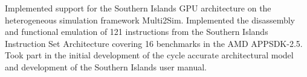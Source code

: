   { Implemented support for the Southern Islands GPU architecture on the heterogeneous simulation framework Multi2Sim. Implemented the disassembly and functional emulation of 121 instructions from the Southern Islands Instruction Set Architecture covering 16 benchmarks in the AMD APPSDK-2.5. Took part in the initial development of the cycle accurate architectural model and development of the Southern Islands user manual. \\
  }
